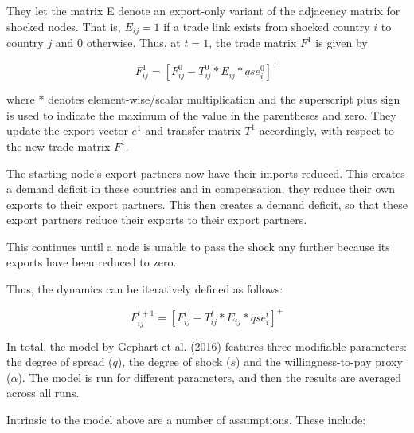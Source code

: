 \documentclass[12pt,letterpaper]{report}
\begin{document}
	They let the matrix E denote an export-only variant of the adjacency matrix for shocked nodes. That is, $E_{ij}= 1$  if a trade link exists from shocked country $i$ to country $j$ and 0 otherwise. Thus, at $t = 1$, the trade matrix $F^{1}$ is given by
	
	\begin{equation}
	\label{eqn:325dynamics1} F_{ij}^{1} = 
	\left[
	F_{ij}^{0} - T_{ij}^{0} * E_{ij} * qse_{i}^{0}
	\right]^{+}
	\end{equation}
	
	where $*$ denotes element-wise/scalar multiplication and the superscript plus sign is used to indicate the maximum of the value in the parentheses and zero. They update the export vector $e^{1}$ and transfer matrix $T^{1}$ accordingly, with respect to the new trade matrix $F^{1}$.
	 
	The starting node's export partners now have their imports reduced. This creates a demand deficit in these countries and in compensation, they reduce their own exports to their export partners. This then creates a demand deficit, so that these export partners reduce their exports to their export partners.
	
	This continues until a node is unable to pass the shock any further because its exports have been reduced to zero.
	
	Thus, the dynamics can be iteratively defined as follows:
	
	\begin{equation}
	\label{eqn:326dynamics2} F_{ij}^{t + 1} = 
	\left[
	F_{ij}^{t} - T_{ij}^{t} * E_{ij} * qse_{i}^{t}
	\right]^{+}
	\end{equation}
	
	In total, the model by Gephart et al. (2016) features three modifiable parameters: the degree of spread ($q$), the degree of shock ($s$) and the willingness-to-pay proxy ($\alpha$). The model is run for different parameters, and then the results are averaged across all runs.
	
	Intrinsic to the model above are a number of assumptions. These include:
	
\end{document}
